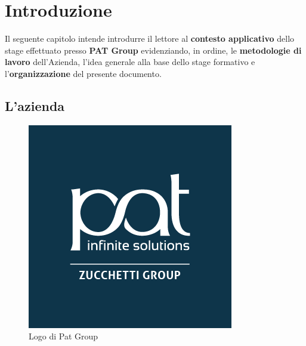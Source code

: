 
\chapter{Introduzione}
\label{cap:introduzione}

Il seguente capitolo intende introdurre il lettore al \textbf{contesto applicativo} dello stage effettuato presso \textbf{PAT Group} evidenziando, in ordine, le \textbf{metodologie di lavoro} dell'Azienda, l'idea generale alla base dello stage formativo e l'\textbf{organizzazione} del presente documento.




\section{L'azienda}

\begin{figure}[!h]     
\centering 
    \includegraphics[width=0.4\columnwidth]{immagini/img/Pat_logo} 
    \caption{Logo di Pat Group}
\end{figure}


